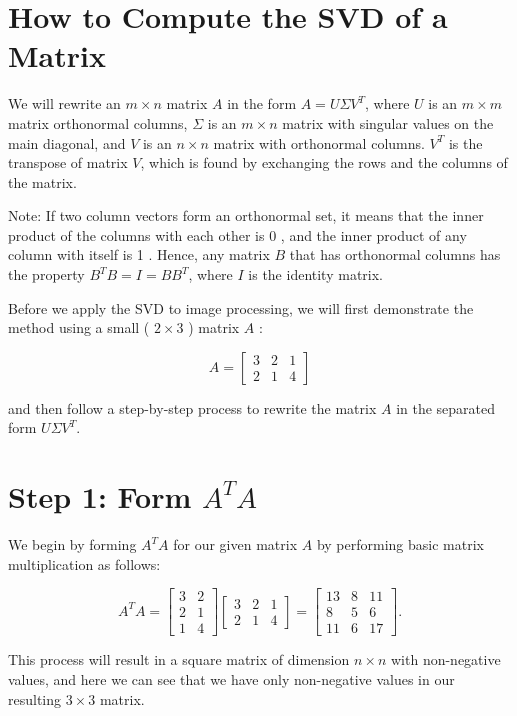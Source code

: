 \documentclass[10pt]{article}
\begin{document}
\section*{How to Compute the SVD of a Matrix}
We will rewrite an $m \times n$ matrix $A$ in the form $A=U \Sigma V^{T}$, where $U$ is an $m \times m$ matrix orthonormal columns, $\Sigma$ is an $m \times n$ matrix with singular values on the main diagonal, and $V$ is an $n \times n$ matrix with orthonormal columns. $V^{T}$ is the transpose of matrix $V$, which is found by exchanging the rows and the columns of the matrix.

Note: If two column vectors form an orthonormal set, it means that the inner product of the columns with each other is 0 , and the inner product of any column with itself is 1 . Hence, any matrix $B$ that has orthonormal columns has the property $B^{T} B=I=B B^{T}$, where $I$ is the identity matrix.

Before we apply the SVD to image processing, we will first demonstrate the method using a small ( $2 \times 3$ ) matrix $A$ :

$$
A=\left[\begin{array}{lll}
3 & 2 & 1 \\
2 & 1 & 4
\end{array}\right]
$$

and then follow a step-by-step process to rewrite the matrix $A$ in the separated form $U \Sigma V^{T}$.

\section*{Step 1: Form $A^{T} A$}
We begin by forming $A^{T} A$ for our given matrix $A$ by performing basic matrix multiplication as follows:

$$
A^{T} A=\left[\begin{array}{ll}
3 & 2 \\
2 & 1 \\
1 & 4
\end{array}\right]\left[\begin{array}{lll}
3 & 2 & 1 \\
2 & 1 & 4
\end{array}\right]=\left[\begin{array}{ccc}
13 & 8 & 11 \\
8 & 5 & 6 \\
11 & 6 & 17
\end{array}\right] .
$$

This process will result in a square matrix of dimension $n \times n$ with non-negative values, and here we can see that we have only non-negative values in our resulting $3 \times 3$ matrix.
\end{document}
